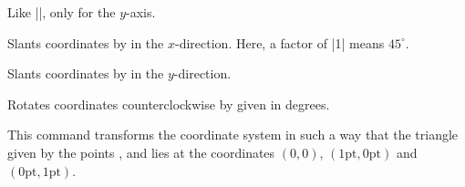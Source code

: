 \begin{command}{\pgftransformyscale{}}
    Like |\pgftransformxscale|, only for the $y$-axis.
\end{command}

\begin{command}{\pgftransformxslant{}}
    Slants coordinates by  in the $x$-direction. Here, a factor of
    |1| means $45^\circ$.
\begin{codeexample}[]
\end{codeexample}
\end{command}

\begin{command}{\pgftransformyslant{}}
    Slants coordinates by  in the $y$-direction.
\begin{codeexample}[]
\end{codeexample}
\end{command}


\begin{command}{\pgftransformrotate{}}
    Rotates coordinates counterclockwise by  given in degrees.
\begin{codeexample}[]
\end{codeexample}
\end{command}

\begin{command}{\pgftransformtriangle{}}
    This command transforms the coordinate system in such a way that the
    triangle given by the points ,  and  lies at the
    coordinates $(0,0)$, $(1\mathrm{pt},0\mathrm{pt})$ and
    $(0\mathrm{pt},1\mathrm{pt})$.
\begin{codeexample}[]
\end{codeexample}
\end{command}

